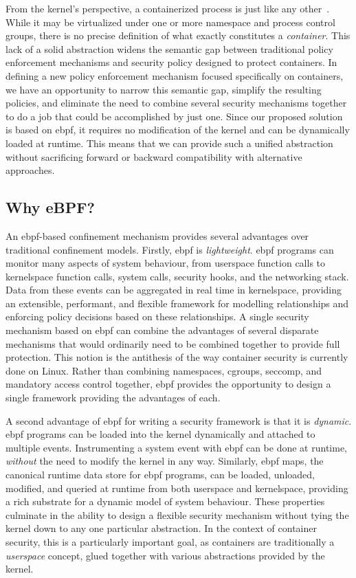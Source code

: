 From the kernel's perspective, a containerized process is just like any
other~\cite{sultan2019_container_security}. While it may be virtualized under one or more
namespace and process control groups, there is no precise definition of what exactly
constitutes a \textit{container}. This lack of a solid abstraction widens the semantic gap
between traditional policy enforcement mechanisms and security policy designed to protect
containers. In defining a new policy enforcement mechanism focused specifically on
containers, we have an opportunity to narrow this semantic gap, simplify the resulting
policies, and eliminate the need to combine several security mechanisms together to do
a job that could be accomplished by just one. Since our proposed solution is based on
\gls{ebpf}, it requires no modification of the kernel and can be dynamically loaded at
runtime.  This means that we can provide such a unified abstraction without sacrificing
forward or backward compatibility with alternative approaches.

\subsection{Why eBPF?}%
\label{ss:why-ebpf}

An \gls{ebpf}-based confinement mechanism provides several advantages over traditional
confinement models.  Firstly, \gls{ebpf} is \textit{lightweight}. \gls{ebpf} programs can monitor
many aspects of system behaviour, from userspace function calls to kernelspace function
calls, system calls, security hooks, and the networking stack. Data from these events can
be aggregated in real time in kernelspace, providing an extensible, performant, and
flexible framework for modelling relationships and enforcing policy decisions based on
these relationships.  A single security mechanism based on \gls{ebpf} can combine the advantages
of several disparate mechanisms that would ordinarily need to be combined together to
provide full protection. This notion is the antithesis of the way container security is
currently done on Linux. Rather than combining namespaces, cgroups, seccomp, and mandatory
access control together, \gls{ebpf} provides the opportunity to design a single framework
providing the advantages of each.

A second advantage of \gls{ebpf} for writing a security framework is that it is
\textit{dynamic}. \gls{ebpf} programs can be loaded into the kernel dynamically and attached to
multiple events. Instrumenting a system event with \gls{ebpf} can be done at runtime,
\textit{without} the need to modify the kernel in any way.  Similarly, \gls{ebpf} maps, the
canonical runtime data store for \gls{ebpf} programs, can be loaded, unloaded, modified, and
queried at runtime from both userspace and kernelspace, providing a rich substrate for
a dynamic model of system behaviour. These properties culminate in the ability to design
a flexible security mechanism without tying the kernel down to any one particular
abstraction. In the context of container security, this is a particularly important goal,
as containers are traditionally a \textit{userspace} concept, glued together with various
abstractions provided by the kernel.

